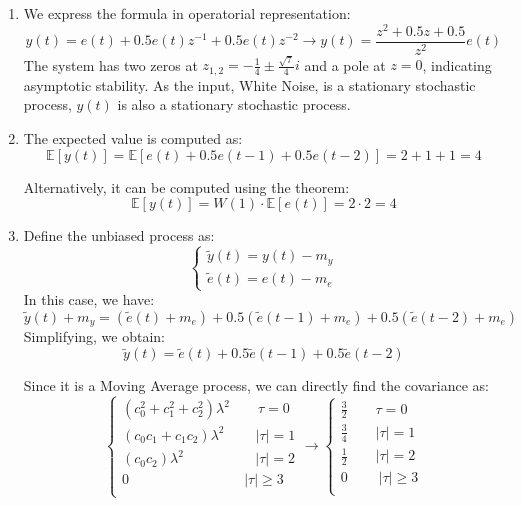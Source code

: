 \begin{enumerate}
    \item We express the formula in operatorial representation:
        \[y(t)=e(t)+0.5e(t)z^{-1}+0.5e(t)z^{-2}\rightarrow y(t)=\dfrac{z^2+0.5z+0.5}{z^2}e(t)\]
        The system has two zeros at $z_{1,2}=-\frac{1}{4}\pm \frac{\sqrt{7}}{4}i$  and a pole at $z=0$, indicating asymptotic stability.
        As the input, White Noise, is a stationary stochastic process, $y(t)$ is also a stationary stochastic process.
    \item The expected value is computed as:
        \[\mathbb{E}\left[ y(t) \right]=\mathbb{E}\left[ e(t)+0.5e(t-1)+0.5e(t-2) \right]=2+1+1=4\]

        Alternatively, it can be computed using the theorem: 
        \[\mathbb{E}\left[ y(t) \right]=W(1)\cdot\mathbb{E}\left[ e(t) \right]=2\cdot 2=4\]
    \item Define the unbiased process as: 
        \[\begin{cases}
            \tilde{y}(t)=y(t)-m_y \\
            \tilde{e}(t)=e(t)-m_e
        \end{cases}\]
        In this case, we have: 
        \[\tilde{y}(t)+m_y=\left(\tilde{e}(t)+m_e\right)+0.5\left(\tilde{e}(t-1)+m_e\right)+0.5\left(\tilde{e}(t-2)+m_e\right)\]
        Simplifying, we obtain: 
        \[\tilde{y}(t)=\tilde{e}(t)+0.5\tilde{e}(t-1)+0.5\tilde{e}(t-2)\]

        Since it is a Moving Average process, we can directly find the covariance as: 
        \[\begin{cases}
            \left(c_0^2+c_1^2+c_2^2\right)\lambda^2 \qquad \tau=0 \\
            \left(c_0c_1+c_1c_2\right)\lambda^2 \qquad\: \left\lvert \tau\right\rvert =1 \\
            \left(c_0c_2\right)\lambda^2 \qquad\qquad\:\:\:\:\: \left\lvert \tau\right\rvert =2 \\
            0 \qquad\qquad\qquad\qquad\: \left\lvert \tau\right\rvert \geq 3 \\
        \end{cases} \rightarrow \begin{cases}
            \frac{3}{2} \qquad \tau=0 \\
            \frac{3}{4} \qquad \left\lvert \tau\right\rvert =1 \\
            \frac{1}{2} \qquad \left\lvert \tau\right\rvert =2 \\
            0 \:\qquad \left\lvert \tau\right\rvert \geq 3 \\
        \end{cases}\]
\end{enumerate}